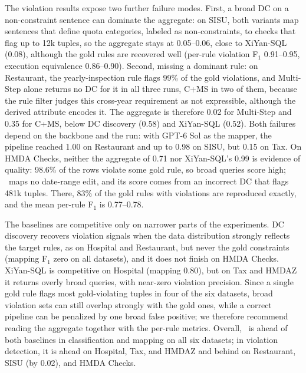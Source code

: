 The violation results expose two further failure modes. First, a broad DC on a non-constraint sentence can dominate the aggregate: on SISU, both variants map sentences that define quota categories, labeled as non-constraints, to checks that flag up to 12k tuples, so the aggregate stays at 0.05--0.06, close to XiYan-SQL (0.08), although the gold rules are recovered well (per-rule violation F$_1$ 0.91--0.95, execution equivalence 0.86--0.90). Second, missing a dominant rule: on Restaurant, the yearly-inspection rule flags 99\% of the gold violations, and Multi-Step alone returns no DC for it in all three runs, C+MS in two of them, because the rule filter judges this cross-year requirement as not expressible, although the derived attribute encodes it. The aggregate is therefore 0.02 for Multi-Step and 0.35 for C+MS, below DC discovery (0.58) and XiYan-SQL (0.52). Both failures depend on the backbone and the run: with GPT-6 Sol as the mapper, the pipeline reached 1.00 on Restaurant and up to 0.98 on SISU, but 0.15 on Tax. On HMDA Checks, neither the aggregate of 0.71 nor XiYan-SQL's 0.99 is evidence of quality: 98.6\% of the rows violate some gold rule, so broad queries score high; \system\ maps no date-range edit, and its score comes from an incorrect DC that flags 481k tuples. There, 83\% of the gold rules with violations are reproduced exactly, and the mean per-rule F$_1$ is 0.77--0.78.

The baselines are competitive only on narrower parts of the experiments. DC discovery recovers violation signals when the data distribution strongly reflects the target rules, as on Hospital and Restaurant, but never the gold constraints (mapping F$_1$ zero on all datasets), and it does not finish on HMDA Checks. XiYan-SQL is competitive on Hospital (mapping 0.80), but on Tax and HMDAZ it returns overly broad queries, with near-zero violation precision. Since a single gold rule flags most gold-violating tuples in four of the six datasets, broad violation sets can still overlap strongly with the gold ones, while a correct pipeline can be penalized by one broad false positive; we therefore recommend reading the aggregate together with the per-rule metrics. Overall, \system\ is ahead of both baselines in classification and mapping on all six datasets; in violation detection, it is ahead on Hospital, Tax, and HMDAZ and behind on Restaurant, SISU (by 0.02), and HMDA Checks.

